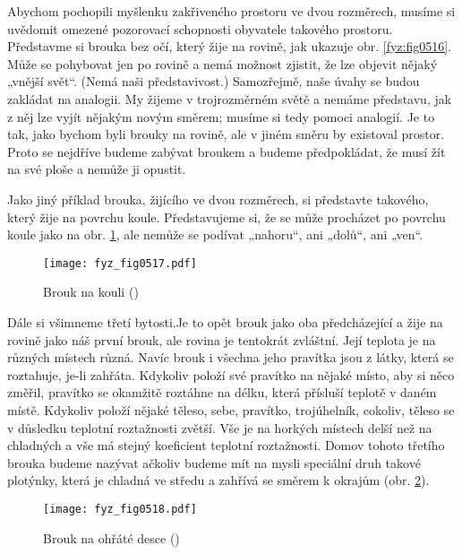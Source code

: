     Abychom pochopili myšlenku zakřiveného prostoru ve dvou rozměrech, musíme si uvědomit omezené 
    pozorovací schopnosti obyvatele takového prostoru. Představme si brouka bez očí, který žije na 
    rovině, jak ukazuje obr. \ref{fyz:fig0516}. Může se pohybovat jen po rovině a nemá možnost 
    zjistit, že lze objevit nějaký „vnější svět“. (Nemá naši představivost.) Samozřejmě, naše úvahy 
    se budou zakládat na analogii. My žijeme v trojrozměrném světě a nemáme představu, jak z něj 
    lze vyjít nějakým novým směrem; musíme si tedy pomoci analogií. Je to tak, jako bychom byli 
    brouky na rovině, ale v jiném směru by existoval prostor. Proto se nejdříve budeme zabývat 
    broukem a budeme předpokládat, že musí žít na své ploše a nemůže ji opustit.
    
    Jako jiný příklad brouka, žijícího ve dvou rozměrech, si představte takového, který žije na 
    povrchu koule. Představujeme si, že se může procházet po povrchu koule jako na obr. 
    \ref{fyz:fig0517}, ale nemůže se podívat „nahoru“, ani „dolů“, ani „ven“.
    
    \begin{figure}[ht!] %
      \centering
      \texttt{[image: fyz\_fig0517.pdf]}
      \caption{Brouk na kouli (\cite[s.~775]{Feynman02})}
      \label{fyz:fig0517}
    \end{figure}
    
    Dále si všimneme třetí bytosti.Je to opět brouk jako oba předcházející a žije na rovině jako 
    náš první brouk, ale rovina je tentokrát zvláštní. Její teplota je na různých místech různá. 
    Navíc brouk i všechna jeho pravítka jsou z látky, která se roztahuje, je-li zahřáta. Kdykoliv 
    položí své pravítko na nějaké místo, aby si něco změřil, pravítko se okamžitě roztáhne na 
    délku, která přísluší teplotě v daném místě. Kdykoliv položí nějaké těleso, sebe, pravítko, 
    trojúhelník, cokoliv, těleso se v důsledku teplotní roztažnosti zvětší. Vše je na horkých 
    místech delší než na chladných a vše má stejný koeficient teplotní roztažnosti. Domov tohoto 
    třetího brouka budeme nazývat  ačkoliv budeme mít na mysli speciální druh 
    takové plotýnky, která je chladná ve středu a zahřívá se směrem k okrajům (obr. 
    \ref{fyz:fig0518}).
    
    \begin{figure}[ht!] %
      \centering
      \texttt{[image: fyz\_fig0518.pdf]}
      \caption{Brouk na ohřáté desce (\cite[s.~776]{Feynman02})}
      \label{fyz:fig0518}
    \end{figure}
    
